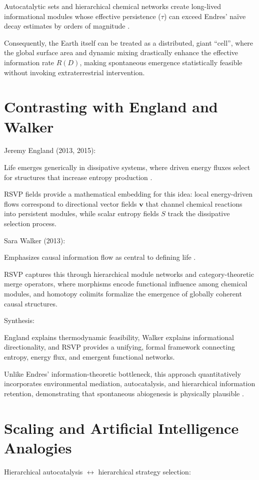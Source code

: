 \documentclass{book}
\begin{document}
Autocatalytic sets and hierarchical chemical networks create long-lived informational modules whose effective persistence ($\tau$) can exceed Endres’ naïve decay estimates by orders of magnitude \citep{vasas2010}.

Consequently, the Earth itself can be treated as a distributed, giant “cell”, where the global surface area and dynamic mixing drastically enhance the effective information rate $R(D)$, making spontaneous emergence statistically feasible without invoking extraterrestrial intervention.

\section{Contrasting with England and Walker}
Jeremy England (2013, 2015):

Life emerges generically in dissipative systems, where driven energy fluxes select for structures that increase entropy production \citep{england2013,england2015}.

RSVP fields provide a mathematical embedding for this idea: local energy-driven flows correspond to directional vector fields $\mathbf{v}$ that channel chemical reactions into persistent modules, while scalar entropy fields $S$ track the dissipative selection process.

Sara Walker (2013):

Emphasizes causal information flow as central to defining life \citep{walker2013}.

RSVP captures this through hierarchical module networks and category-theoretic merge operators, where morphisms encode functional influence among chemical modules, and homotopy colimits formalize the emergence of globally coherent causal structures.

Synthesis:

England explains thermodynamic feasibility, Walker explains informational directionality, and RSVP provides a unifying, formal framework connecting entropy, energy flux, and emergent functional networks.

Unlike Endres’ information-theoretic bottleneck, this approach quantitatively incorporates environmental mediation, autocatalysis, and hierarchical information retention, demonstrating that spontaneous abiogenesis is physically plausible \citep{hordijk2013}.

\section{Scaling and Artificial Intelligence Analogies}
Hierarchical autocatalysis $\leftrightarrow$ hierarchical strategy selection:
\end{document}

